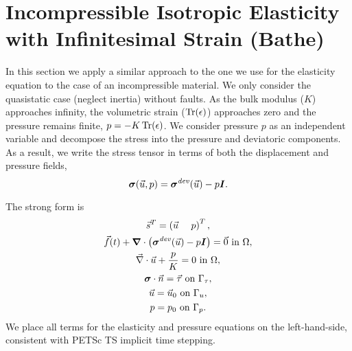 \section{Incompressible Isotropic Elasticity with Infinitesimal Strain (Bathe)}

In this section we apply a similar approach to the one we use for the
elasticity equation to the case of an incompressible material. We only
consider the quasistatic case (neglect inertia) without faults. As the
bulk modulus ($K$) approaches infinity, the volumetric strain
($\operatorname{Tr}(\epsilon)$) approaches zero and the pressure remains finite,
$p = -K \operatorname{Tr}(\epsilon)$. We consider pressure $p$ as an independent
variable and decompose the stress into the pressure and deviatoric
components. As a result, we write the stress tensor in terms of both
the displacement and pressure fields,
\begin{equation}
  \bm{\sigma}(\vec{u},p) = \bm{\sigma}^\mathit{dev}(\vec{u}) - p\bm{I}.
\end{equation}

The strong form is
\begin{gather}
  \vec{s}^T = \left( \vec{u} \quad \ p \right)^T, \\
  \vec{f}(t) + \bm{\nabla} \cdot \left(\bm{\sigma}^\mathit{dev}(\vec{u}) - p\bm{I}\right) = \vec{0} \text{ in }\Omega, \\
  \vec{\nabla} \cdot \vec{u} + \frac{p}{K} = 0 \text{ in }\Omega, \\
  \bm{\sigma} \cdot \vec{n} = \vec{\tau} \text{ on }\Gamma_\tau, \\
  \vec{u} = \vec{u}_0 \text{ on }\Gamma_u, \\
  p = p_0 \text{ on }\Gamma_p.
\end{gather}
We place all terms for the elasticity and pressure equations on the
left-hand-side, consistent with PETSc TS implicit time stepping.

